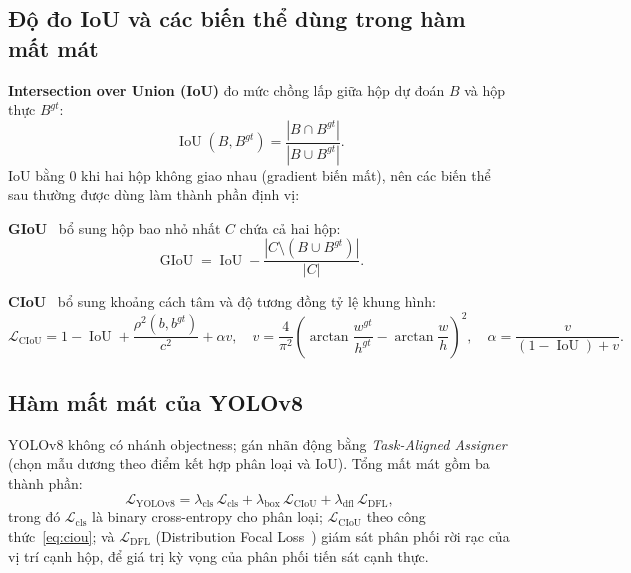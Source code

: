 \documentclass[12pt]{article}
\newcommand{\runin}[1]{\par\medskip\noindent\textbf{#1}\hspace{0.4em}\ignorespaces}
\numberwithin{equation}{section}
\begin{document}
\subsection{Độ đo IoU và các biến thể dùng trong hàm mất mát}

\textbf{Intersection over Union (IoU)} đo mức chồng lấp giữa hộp dự đoán $B$ và hộp thực $B^{gt}$:
\begin{equation}
\operatorname{IoU}(B, B^{gt}) = \frac{|B \cap B^{gt}|}{|B \cup B^{gt}|}.
\label{eq:iou}
\end{equation}
IoU bằng $0$ khi hai hộp không giao nhau (gradient biến mất), nên các biến thể sau thường được
dùng làm thành phần định vị:

\runin{GIoU}~\cite{giou} bổ sung hộp bao nhỏ nhất $C$ chứa cả hai hộp:
\begin{equation}
\operatorname{GIoU} = \operatorname{IoU} - \frac{|C \setminus (B \cup B^{gt})|}{|C|}.
\label{eq:giou}
\end{equation}

\runin{CIoU}~\cite{ciou} bổ sung khoảng cách tâm và độ tương đồng tỷ lệ khung hình:
\begin{equation}
\mathcal{L}_{\text{CIoU}} = 1 - \operatorname{IoU} + \frac{\rho^2(b, b^{gt})}{c^2} + \alpha v,
\quad
v = \frac{4}{\pi^2}\!\left(\arctan\frac{w^{gt}}{h^{gt}} - \arctan\frac{w}{h}\right)^2,
\quad
\alpha = \frac{v}{(1-\operatorname{IoU})+v}.
\label{eq:ciou}
\end{equation}

\subsection{Hàm mất mát của YOLOv8}

YOLOv8 không có nhánh objectness; gán nhãn động bằng \textit{Task-Aligned Assigner} (chọn mẫu
dương theo điểm kết hợp phân loại và IoU). Tổng mất mát gồm ba thành phần:
\begin{equation}
\mathcal{L}_{\text{YOLOv8}} =
\lambda_{\text{cls}}\,\mathcal{L}_{\text{cls}}
+ \lambda_{\text{box}}\,\mathcal{L}_{\text{CIoU}}
+ \lambda_{\text{dfl}}\,\mathcal{L}_{\text{DFL}},
\label{eq:yolov8-loss}
\end{equation}
trong đó $\mathcal{L}_{\text{cls}}$ là binary cross-entropy cho phân loại; $\mathcal{L}_{\text{CIoU}}$
theo công thức~\eqref{eq:ciou}; và $\mathcal{L}_{\text{DFL}}$ (Distribution Focal
Loss~\cite{dfl}) giám sát phân phối rời rạc của vị trí cạnh hộp, để giá trị kỳ vọng của phân
phối tiến sát cạnh thực.
\end{document}
